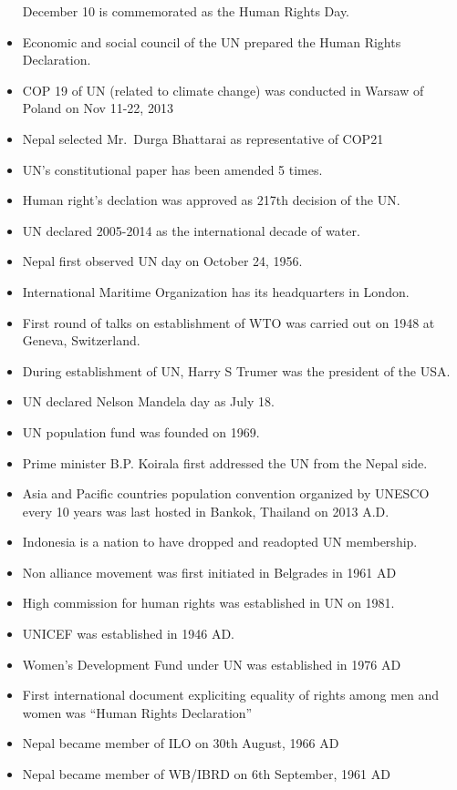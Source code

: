 \documentclass[
  openany]{book}
\begin{document}
\begin{itemize}
  December 10 is commemorated as the Human Rights Day.
\item
  Economic and social council of the UN prepared the Human Rights Declaration.
\item
  COP 19 of UN (related to climate change) was conducted in Warsaw of Poland on Nov 11-22, 2013
\item
  Nepal selected Mr.~Durga Bhattarai as representative of COP21
\item
  UN's constitutional paper has been amended 5 times.
\item
  Human right's declation was approved as 217th decision of the UN.
\item
  UN declared 2005-2014 as the international decade of water.
\item
  Nepal first observed UN day on October 24, 1956.
\item
  International Maritime Organization has its headquarters in London.
\item
  First round of talks on establishment of WTO was carried out on 1948 at Geneva, Switzerland.
\item
  During establishment of UN, Harry S Trumer was the president of the USA.
\item
  UN declared Nelson Mandela day as July 18.
\item
  UN population fund was founded on 1969.
\item
  Prime minister B.P. Koirala first addressed the UN from the Nepal side.
\item
  Asia and Pacific countries population convention organized by UNESCO every 10 years was last hosted in Bankok, Thailand on 2013 A.D.
\item
  Indonesia is a nation to have dropped and readopted UN membership.
\item
  Non alliance movement was first initiated in Belgrades in 1961 AD
\item
  High commission for human rights was established in UN on 1981.
\item
  UNICEF was established in 1946 AD.
\item
  Women's Development Fund under UN was established in 1976 AD
\item
  First international document expliciting equality of rights among men and women was ``Human Rights Declaration''
\item
  Nepal became member of ILO on 30th August, 1966 AD
\item
  Nepal became member of WB/IBRD on 6th September, 1961 AD

\end{itemize}
\end{document}
